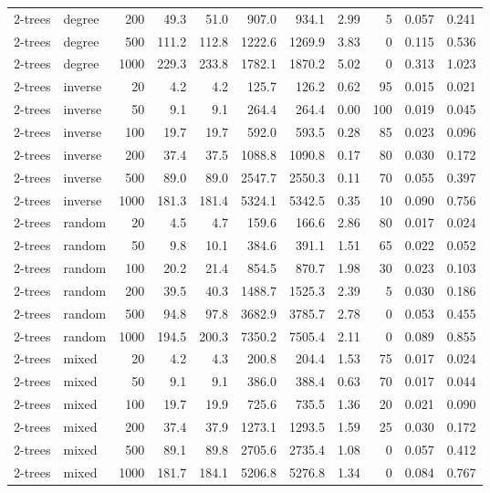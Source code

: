 \begin{tabular}{llrrrrrrrrr}
2-trees & degree & 200 & 49.3 & 51.0 & 907.0 & 934.1 & 2.99 & 5 & 0.057 & 0.241 \\
2-trees & degree & 500 & 111.2 & 112.8 & 1222.6 & 1269.9 & 3.83 & 0 & 0.115 & 0.536 \\
2-trees & degree & 1000 & 229.3 & 233.8 & 1782.1 & 1870.2 & 5.02 & 0 & 0.313 & 1.023 \\
2-trees & inverse & 20 & 4.2 & 4.2 & 125.7 & 126.2 & 0.62 & 95 & 0.015 & 0.021 \\
2-trees & inverse & 50 & 9.1 & 9.1 & 264.4 & 264.4 & 0.00 & 100 & 0.019 & 0.045 \\
2-trees & inverse & 100 & 19.7 & 19.7 & 592.0 & 593.5 & 0.28 & 85 & 0.023 & 0.096 \\
2-trees & inverse & 200 & 37.4 & 37.5 & 1088.8 & 1090.8 & 0.17 & 80 & 0.030 & 0.172 \\
2-trees & inverse & 500 & 89.0 & 89.0 & 2547.7 & 2550.3 & 0.11 & 70 & 0.055 & 0.397 \\
2-trees & inverse & 1000 & 181.3 & 181.4 & 5324.1 & 5342.5 & 0.35 & 10 & 0.090 & 0.756 \\
2-trees & random & 20 & 4.5 & 4.7 & 159.6 & 166.6 & 2.86 & 80 & 0.017 & 0.024 \\
2-trees & random & 50 & 9.8 & 10.1 & 384.6 & 391.1 & 1.51 & 65 & 0.022 & 0.052 \\
2-trees & random & 100 & 20.2 & 21.4 & 854.5 & 870.7 & 1.98 & 30 & 0.023 & 0.103 \\
2-trees & random & 200 & 39.5 & 40.3 & 1488.7 & 1525.3 & 2.39 & 5 & 0.030 & 0.186 \\
2-trees & random & 500 & 94.8 & 97.8 & 3682.9 & 3785.7 & 2.78 & 0 & 0.053 & 0.455 \\
2-trees & random & 1000 & 194.5 & 200.3 & 7350.2 & 7505.4 & 2.11 & 0 & 0.089 & 0.855 \\
2-trees & mixed & 20 & 4.2 & 4.3 & 200.8 & 204.4 & 1.53 & 75 & 0.017 & 0.024 \\
2-trees & mixed & 50 & 9.1 & 9.1 & 386.0 & 388.4 & 0.63 & 70 & 0.017 & 0.044 \\
2-trees & mixed & 100 & 19.7 & 19.9 & 725.6 & 735.5 & 1.36 & 20 & 0.021 & 0.090 \\
2-trees & mixed & 200 & 37.4 & 37.9 & 1273.1 & 1293.5 & 1.59 & 25 & 0.030 & 0.172 \\
2-trees & mixed & 500 & 89.1 & 89.8 & 2705.6 & 2735.4 & 1.08 & 0 & 0.057 & 0.412 \\
2-trees & mixed & 1000 & 181.7 & 184.1 & 5206.8 & 5276.8 & 1.34 & 0 & 0.084 & 0.767 \\
\bottomrule
\end{tabular}
